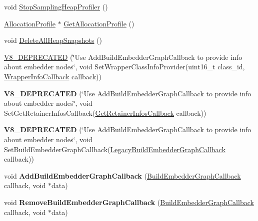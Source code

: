 \begin{DoxyCompactItemize}
\item 
void \mbox{\hyperlink{classv8_1_1HeapProfiler_abc43e12e6febb087be251c0629ff17bf}{Stop\+Sampling\+Heap\+Profiler}} ()
\item 
\mbox{\hyperlink{classv8_1_1AllocationProfile}{Allocation\+Profile}} $\ast$ \mbox{\hyperlink{classv8_1_1HeapProfiler_aaadb22168da6a2889796ed3b5638cd50}{Get\+Allocation\+Profile}} ()
\item 
void \mbox{\hyperlink{classv8_1_1HeapProfiler_a6a75bcc6d8350858597b6a6ce5e349a2}{Delete\+All\+Heap\+Snapshots}} ()
\item 
\mbox{\hyperlink{classv8_1_1HeapProfiler_af41ccd8baea0da8d701e565b7b2e8eab}{V8\+\_\+\+D\+E\+P\+R\+E\+C\+A\+T\+ED}} (\char`\"{}Use Add\+Build\+Embedder\+Graph\+Callback to provide info about embedder nodes\char`\"{}, void Set\+Wrapper\+Class\+Info\+Provider(uint16\+\_\+t class\+\_\+id, \mbox{\hyperlink{classv8_1_1HeapProfiler_a677025dd201fd832e0464e5ab0b0d0d4}{Wrapper\+Info\+Callback}} callback))
\item 
\mbox{\label{classv8_1_1HeapProfiler_a3eec72179d8275779d119eddd999af47}} 
{\bfseries V8\+\_\+\+D\+E\+P\+R\+E\+C\+A\+T\+ED} (\char`\"{}Use Add\+Build\+Embedder\+Graph\+Callback to provide info about embedder nodes\char`\"{}, void Set\+Get\+Retainer\+Infos\+Callback(\mbox{\hyperlink{classv8_1_1HeapProfiler_a7f34c8eb67f9502e5778695187ea0e96}{Get\+Retainer\+Infos\+Callback}} callback))
\item 
\mbox{\label{classv8_1_1HeapProfiler_aad59e7bd760ee8eb06685391193e38ae}} 
{\bfseries V8\+\_\+\+D\+E\+P\+R\+E\+C\+A\+T\+ED} (\char`\"{}Use Add\+Build\+Embedder\+Graph\+Callback to provide info about embedder nodes\char`\"{}, void Set\+Build\+Embedder\+Graph\+Callback(\mbox{\hyperlink{classv8_1_1HeapProfiler_aafaa85413706329f7767f559b701eb1a}{Legacy\+Build\+Embedder\+Graph\+Callback}} callback))
\item 
\mbox{\label{classv8_1_1HeapProfiler_a4aa69e692d215f7b4599afe2c9dbfbfd}} 
void {\bfseries Add\+Build\+Embedder\+Graph\+Callback} (\mbox{\hyperlink{classv8_1_1HeapProfiler_a29c98afa5ce0ea543eef904201bc3e40}{Build\+Embedder\+Graph\+Callback}} callback, void $\ast$data)
\item 
\mbox{\label{classv8_1_1HeapProfiler_a3f7289d12816af7738944f530d28495d}} 
void {\bfseries Remove\+Build\+Embedder\+Graph\+Callback} (\mbox{\hyperlink{classv8_1_1HeapProfiler_a29c98afa5ce0ea543eef904201bc3e40}{Build\+Embedder\+Graph\+Callback}} callback, void $\ast$data)
\end{DoxyCompactItemize}
